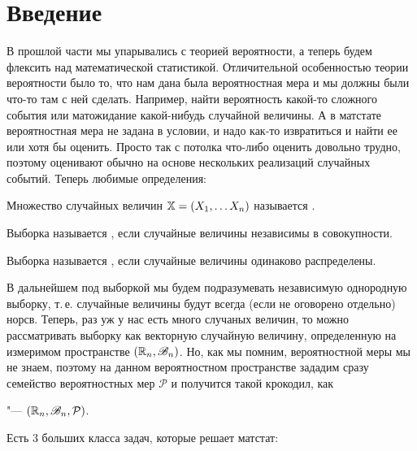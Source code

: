 \documentclass[../TV&MS.tex]{subfiles}
\begin{document}
\section{Введение}

В прошлой части мы упарывались с теорией вероятности, а теперь будем флексить
над математической статистикой. Отличительной особенностью теории вероятности
было то, что нам дана была вероятностная мера и мы должны были что-то там с
ней сделать. Например, найти вероятность какой-то сложного события или 
матожидание какой-нибудь случайной величины. А в матстате вероятностная мера
не задана в условии, и надо как-то извратиться и найти ее или хотя бы оценить.
Просто так с потолка что-либо оценить довольно трудно, поэтому оценивают
обычно на основе нескольких реализаций случайных событий. Теперь любимые
определения:

\begin{Def}
    Множество случайных величин $\mathbb{X} = \left( X_1, \ldots X_n \right)$
    называется .
\end{Def} 
\begin{Def}
    Выборка называется , если случайные величины независимы в совокупности.
\end{Def} 
\begin{Def}
    Выборка называется , если случайные величины одинаково
    распределены.
\end{Def} 
В дальнейшем под выборкой мы будем подразумевать независимую однородную выборку, т.\,е.
случайные величины будут всегда (если не оговорено отдельно) норсв.
Теперь, раз уж у нас есть много случаных величин, то можно рассматривать
выборку как векторную случайную величину, определенную на измеримом
пространстве $ \left( \mathbb{R}_n, \mathscr{B}_n \right) $. Но, как мы помним,
вероятностной меры мы не знаем, поэтому на данном вероятностном пространстве
зададим сразу семейство вероятностных мер $\mathcal{P}$ и получится такой
крокодил, как

\begin{Def}
     "--- $ \left( \mathbb{R}_n, \mathscr{B}_n,
    \mathcal{P}\right) $.
\end{Def} 
Есть 3 больших класса задач, которые решает матстат:
\end{document}
